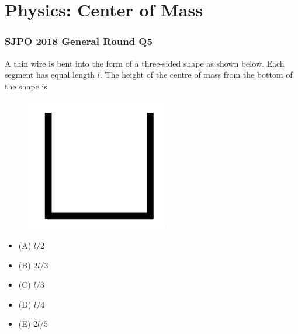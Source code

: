 \documentclass{article}
\begin{document}
\clearpage
\section{Physics: Center of Mass}
\subsubsection{SJPO 2018 General Round Q5}
A thin wire is bent into the form of a three-sided shape as shown below. Each segment has equal length $l$. The height of the centre of mass from the bottom of the shape is \\
{
\begin{figure}
\includegraphics[width=1.0\linewidth]{images/sjpo2018q5.png}
\end{figure}
\begin{itemize}
\item[] (A) $l / 2$
\item[] (B) $2 l / 3$
\item[] (C) $l / 3$
\item[] (D) $l / 4$
\item[] (E) $2 l / 5$
\end{itemize}
}
\end{document}
